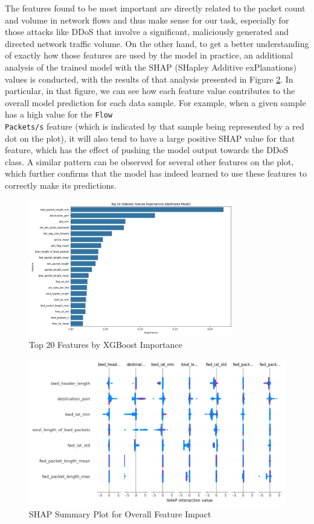 The features found to be most important are directly related to the packet count and volume in network flows and thus make sense for our task, especially for those attacks like DDoS that involve a significant, maliciously generated and directed network traffic volume. On the other hand, to get a better understanding of exactly how those features are used by the model in practice, an additional analysis of the trained model with the SHAP (SHapley Additive exPlanations) values is conducted, with the results of that analysis presented in Figure \ref{fig:shap_summary_plot}. In particular, in that figure, we can see how each feature value contributes to the overall model prediction for each data sample. For example, when a given sample has a high value for the \texttt{Flow\\ Packets/s} feature (which is indicated by that sample being represented by a red dot on the plot), it will also tend to have a large positive SHAP value for that feature, which has the effect of pushing the model output towards the DDoS class. A similar pattern can be observed for several other features on the plot, which further confirms that the model has indeed learned to use these features to correctly make its predictions.


\begin{figure}[H]
\centering
\includegraphics[width=0.8\textwidth]{assets/figures/results/xgboost_feature_importance.png}
\caption{Top 20 Features by XGBoost Importance}
\label{fig:xgboost_feature_importance}
\end{figure}

\begin{figure}[H]
\centering
\includegraphics[width=1\textwidth]{assets/figures/results/shap_summary_plot_overall.png}
\caption{SHAP Summary Plot for Overall Feature Impact}
\label{fig:shap_summary_plot}
\end{figure}

